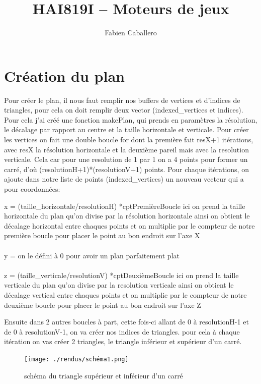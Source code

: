 \documentclass{article}
\title{HAI819I – Moteurs de jeux
}
\author{Fabien Caballero}
\begin{document}
\maketitle
    \tableofcontents

\newpage
\section{Création du plan}
Pour créer le plan, il nous faut remplir nos buffers de vertices et d'indices de triangles, pour cela on doit remplir deux vector (indexed\_vertices et indices).
Pour cela j'ai créé une fonction makePlan, qui prends en paramètres la résolution, le décalage par rapport au centre et la taille horizontale et verticale.
Pour créer les vertices on fait une double boucle for dont la première fait resX+1 itérations, avec resX la résolution horizontale et la deuxième pareil mais avec la resolution verticale.
Cela car pour une resolution de 1 par 1 on a 4 points pour former un carré, d'où (resolutionH+1)*(resolutionV+1) points.
Pour chaque itérations, on ajoute dans notre liste de points (indexed\_vertices) un nouveau vecteur qui a pour coordonnées:

x = (taille\_horizontale/resolutionH) *cptPremièreBoucle  ici on prend la taille horizontale du plan qu'on divise par la résolution horizontale ainsi on obtient le décalage horizontal entre chaques points et on multiplie par le compteur de notre première boucle pour placer le point au bon endroit sur l'axe X 
\\\\
y =  on le défini à 0 pour avoir un plan parfaitement plat
\\\\
z = (taille\_verticale/resolutionV) *cptDeuxièmeBoucle  ici on prend la taille verticale du plan qu'on divise par la resolution verticale ainsi on obtient le décalage vertical entre chaques points et on multiplie par le compteur de notre deuxième boucle pour placer le point au bon endroit sur l'axe Z 

Ensuite dans 2 autres boucles à part, cette fois-ci allant de 0 à resolutionH-1 et de 0 à resolutionV-1, on va créer nos indices de triangles.
pour cela à chaque itération on vas créer 2 triangles, le triangle inférieur et supérieur d'un carré.
\begin{figure}[h!]
\centerline{ \texttt{[image: ./rendus/schéma1.png]} }
\caption{schéma du triangle supérieur et inférieur d'un carré} 
\end{figure}
\end{document}
